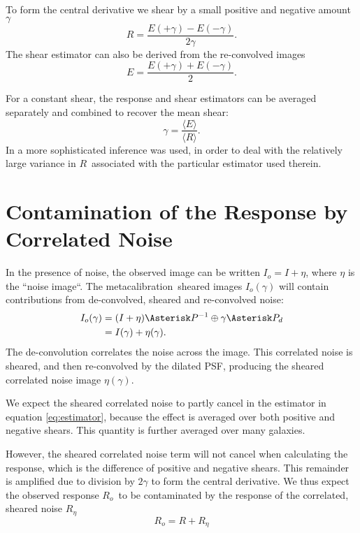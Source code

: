 \documentclass[usegraphicx,usenatbib]{mn2e}
\newcommand{\mcal}{metacalibration}
\newcommand{\mcalR}{$R$}
\newcommand{\mcalRo}{$R_o$}
\newcommand{\mcalRnoise}{$R_\eta$}
\begin{document}
To form the central derivative we shear by a small positive and negative
amount $\gamma$
\begin{equation} \label{eq:Rnum}
    R = \frac{E(+\gamma) - E(-\gamma)}{2 \gamma}.
\end{equation}
The shear estimator can also be derived from the re-convolved
images
\begin{equation} \label{eq:estimator}
    E = \frac{E(+\gamma) + E(-\gamma)}{2}.
\end{equation}

For a constant shear, the response and shear estimators can be averaged
separately and combined to recover the mean shear:
\begin{equation}
    \gamma = \frac{ \langle E \rangle }{\langle \mbox{\mcalR} \rangle}.
\end{equation}
In \cite{HuffMcal} a more sophisticated inference was used, in order to deal
with the relatively large variance in \mcalR\ associated with the particular
estimator used therein.

\section{Contamination of the Response by Correlated Noise} \label{sec:contam}

In the presence of noise, the observed image can be written $I_o=I+\eta$, where $\eta$
is the ``noise image``.  The \mcal\ sheared images $I_o(\gamma)$ will contain
contributions from de-convolved, sheared and re-convolved noise:
\begin{align}
    I_{o}(\gamma) &= (I + \eta) \Asterisk P^{-1} \oplus \gamma \Asterisk P_{d} \nonumber \\
    &= I(\gamma) + \eta(\gamma).
\end{align}
The de-convolution correlates the noise
across the image.  This correlated noise is sheared, and then re-convolved by
the dilated PSF, producing the sheared correlated noise image $\eta(\gamma)$.

We expect the sheared correlated noise to partly cancel in the estimator in
equation \ref{eq:estimator}, because the effect is averaged over both positive
and negative shears. This quantity is further averaged over many galaxies.

However, the sheared correlated noise term will not cancel when calculating the
response, which is the difference of positive and negative shears.  This
remainder is amplified due to division by $2 \gamma$ to form the central
derivative.  We thus expect the observed response \mcalRo\ to be contaminated
by the response of the correlated, sheared noise \mcalRnoise\
\begin{equation}
    \mbox{\mcalRo}  =  R + \mbox{\mcalRnoise}
\end{equation}
\end{document}
